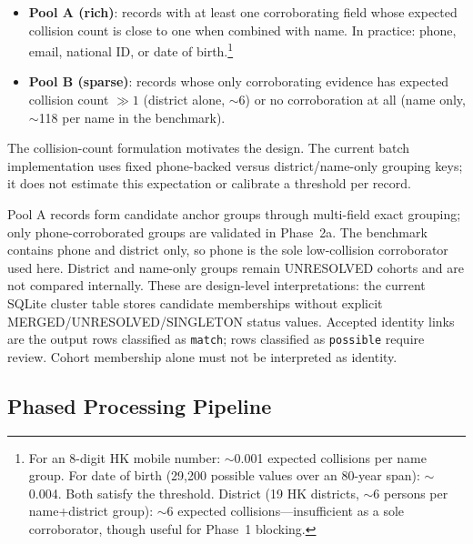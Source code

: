 \documentclass{article}
\begin{document}
\begin{itemize}
\tightlist
\item \textbf{Pool A (rich)}: records with at least one corroborating field whose expected collision count is close to one when combined with name. In practice: phone, email, national ID, or date of birth.\footnote{For an 8-digit HK mobile number: $\sim$0.001 expected collisions per name group. For date of birth (29,200 possible values over an 80-year span): $\sim$0.004. Both satisfy the threshold. District (19 HK districts, $\sim$6 persons per name+district group): $\sim$6 expected collisions—insufficient as a sole corroborator, though useful for Phase~1 blocking.}
\item \textbf{Pool B (sparse)}: records whose only corroborating evidence has expected collision count $\gg 1$ (district alone, $\sim$6) or no corroboration at all (name only, $\sim$118 per name in the benchmark).
\end{itemize}

The collision-count formulation motivates the design. The current batch implementation uses fixed phone-backed versus district/name-only grouping keys; it does not estimate this expectation or calibrate a threshold per record.

Pool A records form candidate anchor groups through multi-field exact grouping; only phone-corroborated groups are validated in Phase~2a. The benchmark contains phone and district only, so phone is the sole low-collision corroborator used here. District and name-only groups remain UNRESOLVED cohorts and are not compared internally. These are design-level interpretations: the current SQLite cluster table stores candidate memberships without explicit MERGED/UNRESOLVED/SINGLETON status values. Accepted identity links are the output rows classified as \texttt{match}; rows classified as \texttt{possible} require review. Cohort membership alone must not be interpreted as identity.

\subsection{Phased Processing Pipeline}
\end{document}
